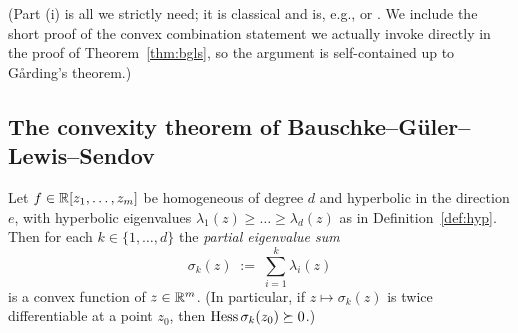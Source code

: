 \noindent (Part (i) is all we strictly need; it is classical and is, e.g.,
\cite[\S2]{BGLS} or \cite{Garding}. We include the short proof of the convex
combination statement we actually invoke directly in the proof of
Theorem~\ref{thm:bgls}, so the argument is self-contained up to G\aa rding's
theorem.)

\subsection*{The convexity theorem of Bauschke--G\"uler--Lewis--Sendov}

\begin{qfourtheorem}\label{thm:bgls}
Let $f\in\mathbb{R}[z_1,\dots,z_m]$ be homogeneous of degree $d$ and hyperbolic in
the direction $e$, with hyperbolic eigenvalues
$\lambda_1(z)\ge\dots\ge\lambda_d(z)$ as in Definition~\ref{def:hyp}. Then for
each $k\in\{1,\dots,d\}$ the \emph{partial eigenvalue sum}
\[
\sigma_k(z)\;:=\;\sum_{i=1}^k\lambda_i(z)
\]
is a convex function of $z\in\mathbb{R}^m$. (In particular, if $z\mapsto\sigma_k(z)$
is twice differentiable at a point $z_0$, then $\operatorname{Hess}\sigma_k(z_0)\succeq 0$.)
\end{qfourtheorem}

